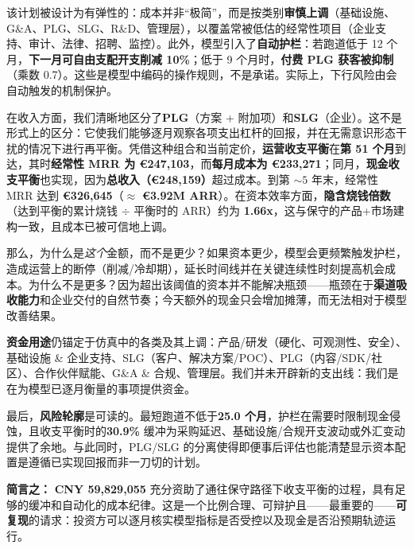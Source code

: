 \documentclass[11pt, a4paper, oneside]{article}
\begin{document}
该计划被设计为有弹性的：成本并非“极简”，而是按类别\textbf{审慎上调}（基础设施、G\&A、PLG、SLG、R\&D、管理层），以覆盖常被低估的经常性项目（企业支持、审计、法律、招聘、监控）。此外，模型引入了\textbf{自动护栏}：若跑道低于 12 个月，\textbf{下一月可自由支配开支削减 10\%}；低于 9 个月时，\textbf{付费 PLG 获客被抑制}（乘数 0.7）。这些是模型中编码的操作规则，不是承诺。实际上，下行风险由会自动触发的机制保护。

在收入方面，我们清晰地区分了\textbf{PLG}（方案 + 附加项）和\textbf{SLG}（企业）。这不是形式上的区分：它使我们能够逐月观察各项支出杠杆的回报，并在无需意识形态干扰的情况下进行再平衡。凭借这种组合和当前定价，\textbf{运营收支平衡}在\textbf{第 51 个月}到达，其时\textbf{经常性 MRR 为 €247{,}103}，而\textbf{每月成本为 €233{,}271}；同月，\textbf{现金收支平衡}也实现，因为\textbf{总收入（€248{,}159）}超过成本。到第 $\sim 5$ 年末，经常性 MRR 达到 \textbf{€326{,}645}（$\approx$ \textbf{€3.92M ARR}）。在资本效率方面，\textbf{隐含烧钱倍数}（达到平衡的累计烧钱 $\div$ 平衡时的 ARR）约为 \textbf{1.66x}，这与保守的产品+市场建构一致，且成本已被可信地上调。

那么，为什么是\emph{这个}金额，而不是更少？如果资本更少，模型会更频繁触发护栏，造成运营上的断停（削减/冷却期），延长时间线并在关键连续性时刻提高机会成本。为什么不是更多？因为超出该阈值的资本并不能解决瓶颈——瓶颈在于\textbf{渠道吸收能力}和企业交付的自然节奏；今天额外的现金只会增加摊薄，而无法相对于模型改善结果。

\textbf{资金用途}仍锚定于仿真中的各类及其上调：产品/研发（硬化、可观测性、安全）、基础设施 \& 企业支持、SLG（客户、解决方案/POC）、PLG（内容/SDK/社区）、合作伙伴赋能、G\&A \& 合规、管理层。我们并未开辟新的支出线：我们是在为模型已逐月衡量的事项提供资金。

最后，\textbf{风险轮廓}是可读的。最短跑道不低于\textbf{25.0 个月}，护栏在需要时限制现金侵蚀，且收支平衡时的\textbf{30.9\%} 缓冲为采购延迟、基础设施/合规开支波动或外汇变动提供了余地。与此同时，PLG/SLG 的分离使得即便事后评估也能清楚显示资本配置是遵循已实现回报而非一刀切的计划。

\textbf{简言之：} \textbf{CNY 59{,}829{,}055} 充分资助了通往保守路径下收支平衡的过程，具有足够的缓冲和自动化的成本纪律。这是一个比例合理、可辩护且——最重要的——\textbf{可复现}的请求：投资方可以逐月核实模型指标是否受控以及现金是否沿预期轨迹运行。
\end{document}
